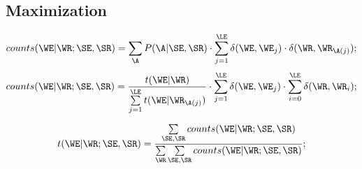 \subsection*{Maximization}
\[
	counts(\WE|\WR; \SE, \SR) = \sum\limits_{\A} P(\A | \SE, \SR) 
		\cdot 
			\sum\limits_{j = 1}^{\LE} 
				\delta(\WE, \WE_j) \cdot \delta(\WR, \WR_{\A(j)});
\]\[
	counts(\WE|\WR; \SE, \SR) = 
			\dfrac{t(\WE|\WR)}		
				{\sum\limits_{j = 1 }^{\LE} t(\WE | \WR_{\A(j)})}
			\cdot 
				\sum\limits_{j = 1}^{\LE} 
					\delta(\WE, \WE_j) 
			\cdot 
				\sum\limits_{i = 0}^{\LE} 
					\delta(\WR, \WR_i);
\]

\[
	t(\WE|\WR; \SE, \SR) = \dfrac{\sum\limits_{\SE, \SR} counts(\WE|\WR; \SE, \SR) }
		{\sum\limits_{\WR} \sum\limits_{\SE, \SR} counts(\WE|\WR; \SE, \SR)};
\]

\pagebreak

